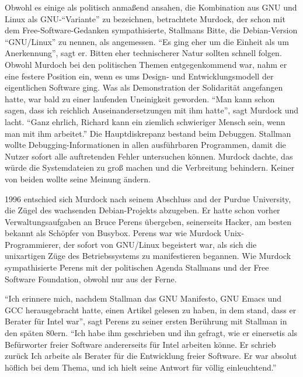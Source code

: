 Obwohl es einige als politisch anmaßend ansahen, die Kombination aus GNU und Linux als GNU-"`Variante"' zu bezeichnen, betrachtete Murdock, der schon mit dem Free-Software-Gedanken sympathisierte, Stallmans Bitte, die Debian-Version "`GNU/Linux"' zu nennen, als angemessen. "`Es ging eher um die Einheit als um Anerkennung"', sagt er.
Bitten eher technischerer Natur sollten schnell folgen. Obwohl Murdoch bei den politischen Themen entgegenkommend war, nahm er eine festere Position ein, wenn es ums Design- und Entwicklungsmodell der eigentlichen Software ging. Was als Demonstration der Solidarität angefangen hatte, war bald zu einer laufenden Uneinigkeit geworden.
"`Man kann schon sagen, dass ich reichlich Auseinandersetzungen mit ihm hatte"', sagt Murdock und lacht. "`Ganz ehrlich, Richard kann ein ziemlich schwieriger Mensch sein, wenn man mit ihm arbeitet."' Die Hauptdiskrepanz bestand beim Debuggen. Stallman wollte Debugging-Informationen in allen ausführbaren Programmen, damit die Nutzer sofort alle auftretenden Fehler untersuchen können. Murdock dachte, das würde die Systemdateien zu groß machen und die Verbreitung behindern. Keiner von beiden wollte seine Meinung ändern.

1996 entschied sich Murdock nach seinem Abschluss and der Purdue University, die Zügel des wachsenden Debian-Projekts abzugeben. Er hatte schon vorher Verwaltungsaufgaben an Bruce Perens übergeben, seinerseits Hacker, am besten bekannt als Schöpfer von Busybox. Perens war wie Murdock Unix-Programmierer, der sofort von GNU/Linux begeistert war, als sich die unix\-artigen Züge des Betriebssystems zu manifestieren begannen. Wie Murdock sympathisierte Perens mit der politischen Agenda Stallmans und der Free Software Foundation, obwohl nur aus der Ferne.

"`Ich erinnere mich, nachdem Stallman das GNU Manifesto, GNU Emacs und GCC herausgebracht hatte, einen Artikel gelesen zu haben, in dem stand, dass er Berater für Intel war"', sagt Perens zu seiner ersten Berührung mit Stallman in den späten 80ern. "`Ich habe ihm geschrieben und ihn gefragt, wie er einersetis als Befürworter freier Software andererseits für Intel arbeiten könne. Er schrieb zurück \glq Ich arbeite als Berater für die Entwicklung freier Software.\grq{} Er war absolut höflich bei dem Thema, und ich hielt seine Antwort für völlig einleuchtend."'

